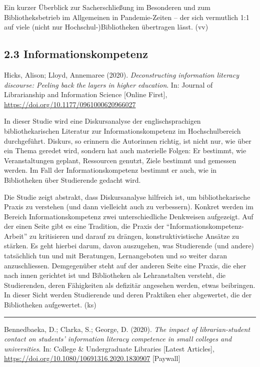 \documentclass[a4paper,
fontsize=11pt,
oneside,
numbers=noperiodatend,
parskip=half-,
bibliography=totoc,
final
]{scrartcl}
\begin{document}
Ein kurzer Überblick zur Sacherschließung im Besonderen und zum
Bibliotheksbetrieb im Allgemeinen in Pandemie-Zeiten -- der sich
vermutlich 1:1 auf viele (nicht nur Hochschul-)Bibliotheken übertragen
lässt. (vv)

\hypertarget{informationskompetenz}{%
\subsection{2.3 Informationskompetenz}\label{informationskompetenz}}

Hicks, Alison; Lloyd, Annemaree (2020). \emph{Deconstructing information
literacy discourse: Peeling back the layers in higher education}. In:
Journal of Librarianship and Information Science {[}Online First{]},
\url{https://doi.org/10.1177/0961000620966027}

In dieser Studie wird eine Diskursanalyse der englischsprachigen
bibliothekarischen Literatur zur Informationskompetenz im
Hochschulbereich durchgeführt. Diskurs, so erinnern die Autorinnen
richtig, ist nicht nur, wie über ein Thema geredet wird, sondern hat
auch materielle Folgen: Er bestimmt, wie Veranstaltungen geplant,
Ressourcen genutzt, Ziele bestimmt und gemessen werden. Im Fall der
Informationskompetenz bestimmt er auch, wie in Bibliotheken über
Studierende gedacht wird.

Die Studie zeigt abstrakt, dass Diskursanalyse hilfreich ist, um
bibliothekarische Praxis zu verstehen (und dann vielleicht auch zu
verbessern). Konkret werden im Bereich Informationskompetenz zwei
unterschiedliche Denkweisen aufgezeigt. Auf der einen Seite gibt es eine
Tradition, die Praxis der \enquote{Informationskompetenz-Arbeit} zu
kritisieren und darauf zu drängen, konstruktivistische Ansätze zu
stärken. Es geht hierbei darum, davon auszugehen, was Studierende (und
andere) tatsächlich tun und mit Beratungen, Lernangeboten und so weiter
daran anzuschliessen. Demgegenüber steht auf der anderen Seite eine
Praxis, die eher nach innen gerichtet ist und Bibliotheken als
Lehranstalten versteht, die Studierenden, deren Fähigkeiten als
defizitär angesehen werden, etwas beibringen. In dieser Sicht werden
Studierende und deren Praktiken eher abgewertet, die der Bibliotheken
aufgewertet. (ks)

\begin{center}\rule{0.5\linewidth}{0.5pt}\end{center}

Bennedbaeka, D.; Clarka, S.; George, D. (2020). \emph{The impact of
librarian-student contact on students' information literacy competence
in small colleges and universities}. In: College \& Undergraduate
Libraries {[}Latest Articles{]},
\url{https://doi.org/10.1080/10691316.2020.1830907} {[}Paywall{]}
\end{document}
